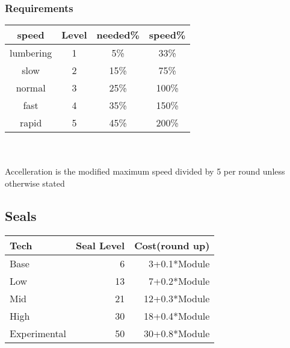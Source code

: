 \subsubsection{Requirements}
\begin{tabular}{c|c|c|c}
    speed       &Level  &needed\%& speed\% \\\hline
    lumbering   &1      &5\%     &33\%\\
    slow        &2      &15\%    &75\%\\
    normal      &3      &25\%    &100\%\\
    fast        &4      &35\%    &150\%\\
    rapid       &5      &45\%    &200\%\\
\end{tabular}\\\newline\\
Accelleration is the modified maximum speed divided by 5 per round unless otherwise stated
\subsection{Seals}\label{subsec:seals}
\begin{tabular}{l|r|r}
    Tech & Seal Level & Cost(round up)\\\hline
    Base &  6 &  3+0.1*Module\\
    Low &   13&  7+0.2*Module\\
    Mid &   21&  12+0.3*Module\\
    High &  30&  18+0.4*Module\\
    Experimental & 50&30+0.8*Module\\
\end{tabular}\\
